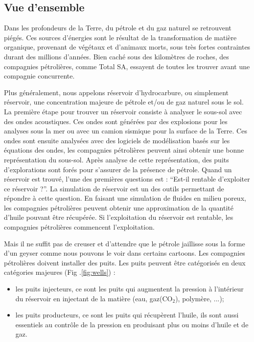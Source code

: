 \subsection{Vue d'ensemble}
Dans les profondeurs de la Terre, du pétrole et du gaz naturel se retrouvent piégés.
%
Ces sources d'énergies sont le résultat de la transformation de matière organique, provenant de végétaux et d'animaux morts, sous très fortes contraintes durant des millions d'années.
%
Bien caché sous des kilomètres de roches, des compagnies pétrolières, comme Total SA, essayent de toutes les trouver avant une compagnie concurrente.


Plus généralement, nous appelons réservoir d'hydrocarbure, ou simplement réservoir, une concentration majeure de pétrole et/ou de gaz naturel sous le sol.
%
La première étape pour trouver un réservoir consiste à analyser le sous-sol avec des ondes acoustiques.
%
Ces ondes sont générées par des explosions pour les analyses sous la mer ou avec un camion sismique pour la surface de la Terre.
%
Ces ondes sont ensuite analysées avec des logiciels de modélisation basés sur les équations des ondes, les compagnies pétrolières peuvent ainsi obtenir une bonne représentation du sous-sol.
%
Après analyse de cette représentation, des puits d'explorations sont forés pour s'assurer de la présence de pétrole.
%
Quand un réservoir est trouvé, l'une des premières questions est : ``Est-il rentable d'exploiter ce réservoir ?''.
%
La simulation de réservoir est un des outils permettant de répondre à cette question.
%
En faisant une simulation de fluides en milieu poreux, les compagnies pétrolières peuvent obtenir une approximation de la quantité d'huile pouvant être récupérée.
%
Si l'exploitation du réservoir est rentable, les compagnies pétrolières commencent l'exploitation.


Mais il ne suffit pas de creuser et d'attendre que le pétrole jaillisse sous la forme d'un geyser comme nous pouvons le voir dans certains cartoons.
%
Les compagnies pétrolières doivent installer des puits.
%
Les puits peuvent être catégorisés en deux catégories majeures (Fig .\ref{fig:wells}) :
%
\begin{itemize}
  \item les puits injecteurs, ce sont les puits qui augmentent la pression à l'intérieur du réservoir en injectant de la matière (eau, gaz(CO$_2$), polymère, ...);
  \item les puits producteurs, ce sont les puits qui récupèrent l'huile, ils sont aussi essentiels au contrôle de la pression en produisant plus ou moins d'huile et de gaz.
\end{itemize}

